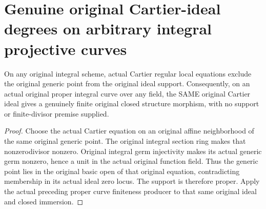 \section{Genuine original Cartier-ideal degrees on arbitrary integral projective curves}

\begin{theorem}
\label{thm:fc-curve-cartier-ideal-finite}
\leanok
{}
On any original integral scheme, actual Cartier regular local equations
exclude the original generic point from the original ideal support.
Consequently, on an actual original proper integral curve over any field,
the SAME original Cartier ideal gives a genuinely finite original closed
structure morphism, with no support or finite-divisor premise supplied.
\end{theorem}
\begin{proof}
Choose the actual Cartier equation on an original affine neighborhood of
the same original generic point. The original integral section ring makes
that nonzerodivisor nonzero. Original integral germ injectivity makes its
actual generic germ nonzero, hence a unit in the actual original function
field. Thus the generic point lies in the original basic open of that
original equation, contradicting membership in its actual ideal zero locus.
The support is therefore proper. Apply the actual preceding proper curve
finiteness producer to that same original ideal and closed immersion.
\end{proof}

